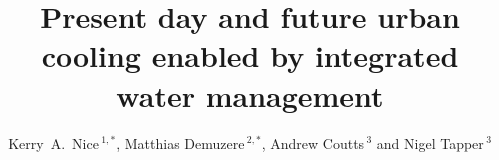 \documentclass[utf8]{frontiersSCNS} %
\def\firstAuthorLast{Nice {et~al.}} %
\def\Authors{Kerry~A.~Nice\,$^{1,*}$, Matthias Demuzere\,$^{2,*}$, Andrew Coutts\,$^{3}$ and Nigel Tapper\,$^{3}$}
\begin{document}
\onecolumn
{}

\title[Present day and future urban cooling enabled by integrated water management]{Present day and future urban cooling enabled by integrated water management} 

\author[\firstAuthorLast ]{\Authors} %
\address{} %
\correspondance{} %



\maketitle
\end{document}
